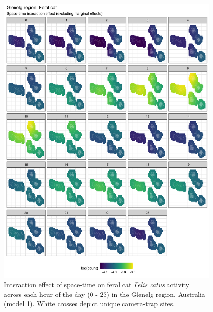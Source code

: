 \documentclass[11pt,a4paper,titlepage,twoside,openright]{style/unimelbthesis}
\begin{document}
\begin{mainmatter}
\begin{figure}
{\centering \includegraphics[width=1\linewidth]{figure/spte_diff_avg_g_cat} 

}

\caption{Interaction effect of space-time on feral cat \textit{Felis catus} activity across each hour of the day (0 - 23) in the Glenelg region, Australia (model 1). White crosses depict unique camera-trap sites. }\label{fig:diel-st-int-g-cat}
\end{figure}
\newpage
\begin{figure}


\end{figure}
\end{mainmatter}
\end{document}
